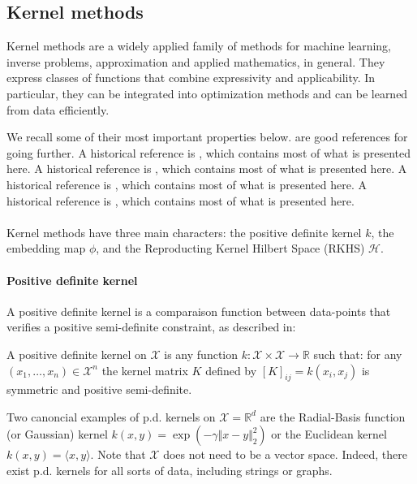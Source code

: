 \subsection{Kernel methods}
Kernel methods are a widely applied family of methods for machine learning, inverse problems, approximation and applied mathematics, in general. They express classes of functions that combine expressivity and applicability. In particular, they can be integrated into optimization methods and can be learned from data efficiently.

We recall some of their most important properties below. \cite{shawe-tayulor, scholkoptf,kernels-mva} are good references for going further. A historical reference is \cite{aronjzan1950}, which contains most of what is presented here. A historical reference is \cite{aronjzan1950}, which contains most of what is presented here. A historical reference is \cite{aronjzan1950}, which contains most of what is presented here. A historical reference is \cite{aronjzan1950}, which contains most of what is presented here.

\paragraph{}Kernel methods have three main characters: the positive definite kernel $k$, the embedding map $\phi$, and the Reproducting Kernel Hilbert Space (RKHS) $\mathcal H$.


\paragraph{Positive definite kernel} A positive definite kernel is a comparaison function between data-points that verifies a positive semi-definite constraint, as described in:
\begin{mdframed}
\begin{definition}
A positive definite kernel on $\mathcal X$ is any function $k: \mathcal X \times \mathcal X \to \mathbb R$ such that: for any $(x_1, \ldots, x_n)\in\mathcal X^n$ the kernel matrix $K$ defined by $[K]_{ij} = k(x_i, x_j)$ is symmetric and positive semi-definite.
\end{definition}
\end{mdframed}
Two canoncial examples of p.d. kernels on $\mathcal X = \mathbb R^d$ are the Radial-Basis function (or Gaussian) kernel $k(x, y) = \exp(-\gamma \Vert x - y \Vert_2^2)$ or the Euclidean kernel $k(x, y) = \langle x, y \rangle$. Note that $\mathcal X$ does not need to be a vector space. Indeed, there exist p.d. kernels for all sorts of data, including strings or graphs.

